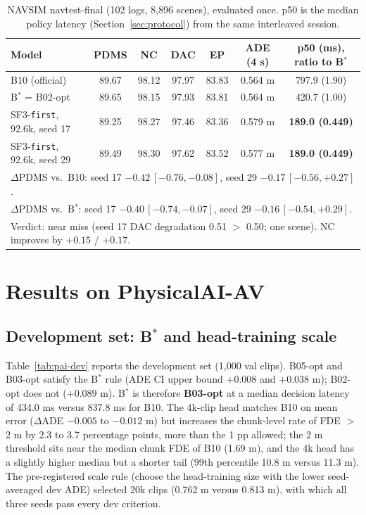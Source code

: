 \documentclass[10pt]{article}
\newcommand{\Bstar}{B$^{*}$}
\newcommand{\first}{\texttt{first}}
\begin{document}
\begin{table}[t]
\caption{NAVSIM navtest-final (102 logs, 8,896 scenes), evaluated once. p50 is the median policy latency (Section~\ref{sec:protocol}) from the same interleaved session.}
\label{tab:navsim-final}
\begin{center}
\footnotesize
\setlength{\tabcolsep}{4pt}
\begin{tabular}{lcccccc}
\toprule
Model & PDMS & NC & DAC & EP & ADE (4 s) & p50 (ms), ratio to \Bstar{} \\
\midrule
B10 (official) & 89.67 & 98.12 & 97.97 & 83.83 & 0.564 m & 797.9 (1.90) \\
\Bstar{} = B02-opt & 89.65 & 98.15 & 97.93 & 83.81 & 0.564 m & 420.7 (1.00) \\
SF3-\first{}, 92.6k, seed 17 & 89.25 & 98.27 & 97.46 & 83.36 & 0.579 m & \textbf{189.0 (0.449)} \\
SF3-\first{}, 92.6k, seed 29 & 89.49 & 98.30 & 97.62 & 83.52 & 0.577 m & \textbf{189.0 (0.449)} \\
\midrule
\multicolumn{7}{l}{$\Delta$PDMS vs.\ B10: seed 17 $-0.42\,[-0.76,-0.08]$, seed 29 $-0.17\,[-0.56,+0.27]$.} \\
\multicolumn{7}{l}{$\Delta$PDMS vs.\ \Bstar{}: seed 17 $-0.40\,[-0.74,-0.07]$, seed 29 $-0.16\,[-0.54,+0.29]$.} \\
\multicolumn{7}{l}{Verdict: near miss (seed 17 DAC degradation 0.51 $>$ 0.50; one scene). NC improves by $+0.15$ / $+0.17$.} \\
\bottomrule
\end{tabular}
\end{center}
\end{table}

\section{Results on PhysicalAI-AV}
\label{sec:pai}

\subsection{Development set: \Bstar{} and head-training scale}
\label{sec:pai-dev}

Table~\ref{tab:pai-dev} reports the development set (1,000 val clips). B05-opt and B03-opt satisfy the \Bstar{} rule (ADE CI upper bound $+0.008$ and $+0.038$ m); B02-opt does not ($+0.089$ m). \Bstar{} is therefore \textbf{B03-opt} at a median decision latency of 434.0 ms versus 837.8 ms for B10. The 4k-clip head matches B10 on mean error ($\Delta$ADE $-0.005$ to $-0.012$ m) but increases the chunk-level rate of FDE $>$ 2 m by 2.3 to 3.7 percentage points, more than the 1 pp allowed; the 2 m threshold sits near the median chunk FDE of B10 (1.69 m), and the 4k head has a slightly higher median but a shorter tail (99th percentile 10.8 m versus 11.3 m). The pre-registered scale rule (choose the head-training size with the lower seed-averaged dev ADE) selected 20k clips (0.762 m versus 0.813 m), with which all three seeds pass every dev criterion.
\end{document}

